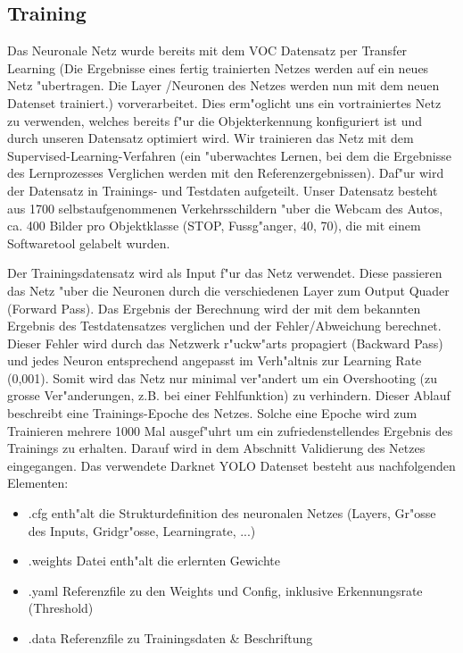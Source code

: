 \subsection{Training}

Das Neuronale Netz wurde bereits mit dem VOC Datensatz per Transfer Learning (Die Ergebnisse eines fertig trainierten Netzes werden auf ein neues Netz "ubertragen. Die Layer /Neuronen des Netzes werden nun mit dem neuen Datenset trainiert.) vorverarbeitet. Dies erm"oglicht uns ein vortrainiertes Netz zu verwenden, welches bereits f"ur die Objekterkennung konfiguriert ist und durch unseren Datensatz optimiert wird. Wir trainieren das Netz mit dem Supervised-Learning-Verfahren (ein "uberwachtes Lernen, bei dem die Ergebnisse des Lernprozesses Verglichen werden mit den Referenzergebnissen).  Daf"ur wird der Datensatz in Trainings- und Testdaten aufgeteilt. Unser Datensatz besteht aus 1700 selbstaufgenommenen Verkehrsschildern "uber die Webcam des Autos, ca. 400 Bilder pro Objektklasse (STOP, Fussg"anger, 40, 70), die mit einem Softwaretool gelabelt wurden.

Der Trainingsdatensatz wird als Input f"ur das Netz verwendet. Diese passieren das Netz "uber die Neuronen durch die verschiedenen Layer zum Output Quader (Forward Pass). Das Ergebnis der Berechnung wird der mit dem bekannten Ergebnis des Testdatensatzes verglichen und der Fehler/Abweichung berechnet. Dieser Fehler wird durch das Netzwerk r"uckw"arts propagiert (Backward Pass) und jedes Neuron entsprechend angepasst im Verh"altnis zur Learning Rate (0,001). Somit wird das Netz nur minimal ver"andert um ein Overshooting (zu grosse Ver"anderungen, z.B. bei einer Fehlfunktion) zu verhindern. Dieser Ablauf beschreibt eine Trainings-Epoche des Netzes.  Solche eine Epoche wird zum Trainieren mehrere 1000 Mal ausgef"uhrt um ein zufriedenstellendes Ergebnis des Trainings zu erhalten. Darauf wird in dem Abschnitt Validierung des Netzes eingegangen. Das verwendete Darknet YOLO Datenset besteht aus nachfolgenden Elementen:

\begin{itemize}
	\item .cfg enth"alt die Strukturdefinition des neuronalen Netzes (Layers, Gr"osse des Inputs, Gridgr"osse, Learningrate, ...)
	\item .weights Datei enth"alt die erlernten Gewichte
	\item .yaml Referenzfile zu den Weights und Config, inklusive Erkennungsrate (Threshold)
	\item .data Referenzfile zu Trainingsdaten \& Beschriftung
\end{itemize}

